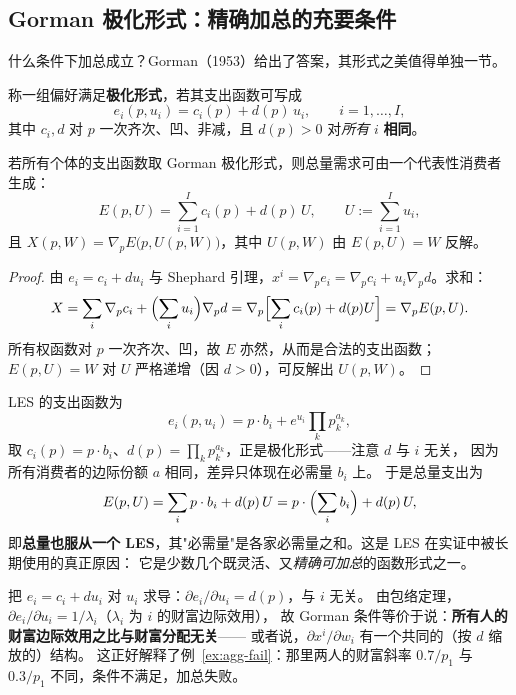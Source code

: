 \subsection{Gorman 极化形式：精确加总的充要条件}

什么条件下加总成立？Gorman（1953）给出了答案，其形式之美值得单独一节。

\begin{definition}
称一组偏好满足\textbf{极化形式}，若其支出函数可写成
\[
 e_i(p,u_i)=c_i(p)+d(p)\,u_i,\qquad i=1,\ldots,I,
\]
其中 $c_i,d$ 对 $p$ 一次齐次、凹、非减，且 $d(p)>0$ 对\emph{所有} $i$ \textbf{相同}。
\end{definition}

\begin{proposition}[精确加总]\label{prop:gorman}
若所有个体的支出函数取 Gorman 极化形式，则总量需求可由一个代表性消费者生成：
\[
 E(p,U)=\sum_{i=1}^{I}c_i(p)+d(p)\,U,\qquad U:=\sum_{i=1}^{I}u_i,
\]
且 $X(p,W)=\nabla_pE\bigl(p,U(p,W)\bigr)$，其中 $U(p,W)$ 由 $E(p,U)=W$ 反解。
\end{proposition}

\begin{proof}
由 $e_i=c_i+du_i$ 与 Shephard 引理，$x^i=\nabla_pe_i=\nabla_pc_i+u_i\nabla_pd$。求和：
\[
 X=\sum_i\nabla_pc_i+\Bigl(\sum_iu_i\Bigr)\nabla_pd
 =\nabla_p\Bigl[\sum_ic_i(p)+d(p)U\Bigr]=\nabla_pE(p,U).
\]
所有权函数对 $p$ 一次齐次、凹，故 $E$ 亦然，从而是合法的支出函数；
$E(p,U)=W$ 对 $U$ 严格递增（因 $d>0$），可反解出 $U(p,W)$。
\end{proof}

\begin{example}
LES 的支出函数为
\[
 e_i(p,u_i)=p\cdot b_i+e^{u_i}\prod_{k}p_k^{a_k},
\]
取 $c_i(p)=p\cdot b_i$、$d(p)=\prod_kp_k^{a_k}$，正是极化形式——注意 $d$ 与 $i$ 无关，
因为所有消费者的边际份额 $a$ 相同，差异只体现在必需量 $b_i$ 上。
于是总量支出为
\[
 E(p,U)=\sum_ip\cdot b_i+d(p)\,U=p\cdot\Bigl(\sum_ib_i\Bigr)+d(p)\,U,
\]
即\textbf{总量也服从一个 LES}，其"必需量"是各家必需量之和。这是 LES 在实证中被长期使用的真正原因：
它是少数几个既灵活、又\emph{精确可加总}的函数形式之一。
\end{example}

\begin{remark}
把 $e_i=c_i+du_i$ 对 $u_i$ 求导：$\partial e_i/\partial u_i=d(p)$，与 $i$ 无关。
由包络定理，$\partial e_i/\partial u_i=1/\lambda_i$（$\lambda_i$ 为 $i$ 的财富边际效用），
故 Gorman 条件等价于说：\textbf{所有人的财富边际效用之比与财富分配无关}——
或者说，$\partial x^i/\partial w_i$ 有一个共同的（按 $d$ 缩放的）结构。
这正好解释了例~\ref{ex:agg-fail}：那里两人的财富斜率 $0.7/p_1$ 与 $0.3/p_1$ 不同，条件不满足，加总失败。
\end{remark}

